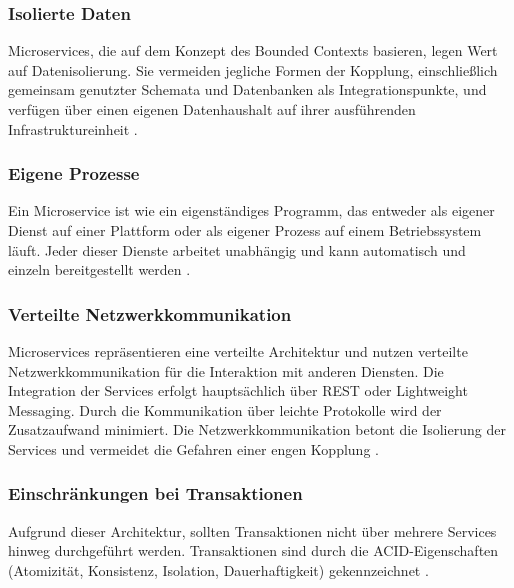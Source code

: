 {\subsubsection{Isolierte Daten}

Microservices, die auf dem Konzept des Bounded Contexts basieren, legen Wert auf Datenisolierung. Sie vermeiden jegliche Formen der Kopplung, einschließlich gemeinsam genutzter Schemata und Datenbanken als Integrationspunkte, und verfügen über einen eigenen Datenhaushalt auf ihrer ausführenden Infrastruktureinheit \cite[S. 2, 31-37]{wolff} \cite[S.255]{richards}.

\subsubsection{Eigene Prozesse}

Ein Microservice ist wie ein eigenständiges Programm, das entweder als eigener Dienst auf einer Plattform oder als eigener Prozess auf einem Betriebssystem läuft. Jeder dieser Dienste arbeitet unabhängig und kann automatisch und einzeln bereitgestellt werden \cite[S.23]{newman} \cite[S.253]{richards} \cite[S. 2, 31-37]{wolff} \cite[S.154-157]{sommerville}.

\subsubsection{Verteilte Netzwerkkommunikation}
Microservices repräsentieren eine verteilte Architektur und nutzen verteilte Netzwerkkommunikation für die Interaktion mit anderen Diensten. Die Integration der Services erfolgt hauptsächlich über REST oder Lightweight Messaging. Durch die Kommunikation über leichte Protokolle wird der Zusatzaufwand minimiert. Die Netzwerkkommunikation betont die Isolierung der Services und vermeidet die Gefahren einer engen Kopplung \cite[S.253]{richards} \cite[S. 2, 31-37]{wolff} \cite[S.154-157]{sommerville} \cite[S.128]{dowalil} \cite[S.23]{newman}.

\subsubsection{Einschränkungen bei Transaktionen}

Aufgrund dieser Architektur, sollten Transaktionen nicht über mehrere Services hinweg durchgeführt werden. Transaktionen sind durch die ACID-Eigenschaften (Atomizität, Konsistenz, Isolation, Dauerhaftigkeit) gekennzeichnet \cite[S.253]{richards} \cite[S. 2, 31-37]{wolff}.

}
